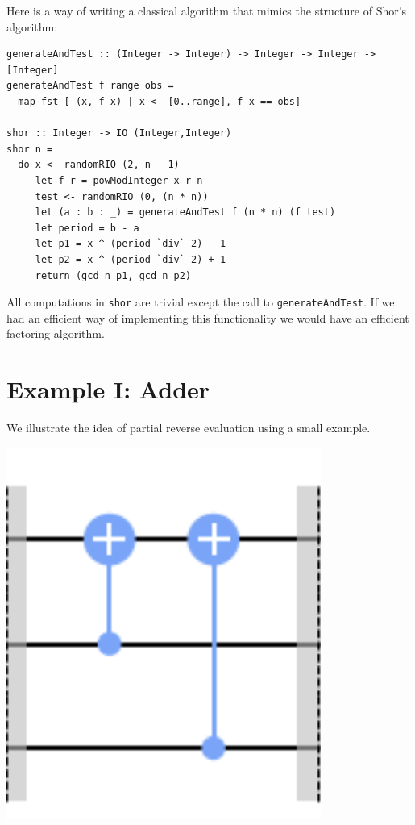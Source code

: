 \documentclass{article}
\begin{document}
Here is a way of writing a classical algorithm that mimics the
structure of Shor's algorithm:

\begin{verbatim}
generateAndTest :: (Integer -> Integer) -> Integer -> Integer -> [Integer]
generateAndTest f range obs =
  map fst [ (x, f x) | x <- [0..range], f x == obs]

shor :: Integer -> IO (Integer,Integer)
shor n = 
  do x <- randomRIO (2, n - 1)
     let f r = powModInteger x r n                       
     test <- randomRIO (0, (n * n))
     let (a : b : _) = generateAndTest f (n * n) (f test)
     let period = b - a                                  
     let p1 = x ^ (period `div` 2) - 1                   
     let p2 = x ^ (period `div` 2) + 1                   
     return (gcd n p1, gcd n p2)                         
\end{verbatim}

All computations in \verb|shor| are trivial except the call to
\verb|generateAndTest|. If we had an efficient way of implementing
this functionality we would have an efficient factoring algorithm.     

\section{Example I: Adder}

We illustrate the idea of partial reverse evaluation using a small example.

\begin{center}
  \includegraphics[scale=0.5]{bac-adder.png}
\end{center}
\end{document}

